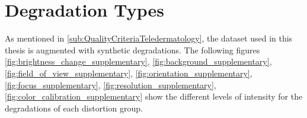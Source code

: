 \section{Degradation Types}
\label{sec:Degradation_Types}

As mentioned in \autoref{sub:QualityCriteriaTeledermatology}, the dataset used in this thesis is augmented with synthetic degradations. The following figures
\autoref{fig:brightness_change_supplementary}, 
\autoref{fig:background_supplementary}, 
\autoref{fig:field_of_view_supplementary}, 
\autoref{fig:orientation_supplementary}, 
\autoref{fig:focus_supplementary}, 
\autoref{fig:resolution_supplementary}, 
\autoref{fig:color_calibration_supplementary}
  show the different levels of intensity for the degradations of each distortion group. 
\begin{figure}
    \centering
    \setlength{\tabcolsep}{1pt}
    \Large
\end{figure}
